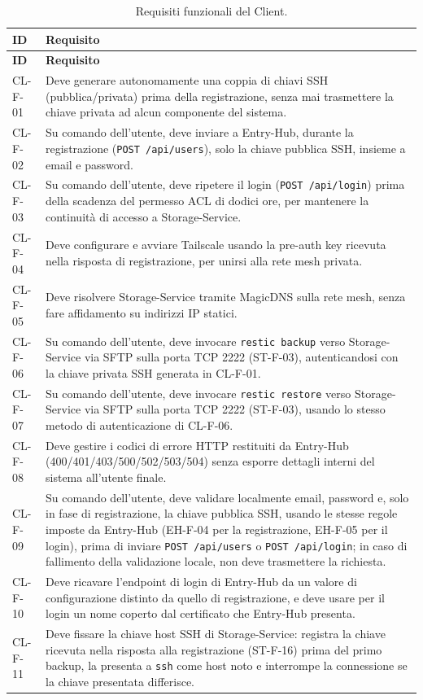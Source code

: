 \begin{longtable}{p{2.6cm} p{\dimexpr\linewidth-2.6cm-4\tabcolsep\relax}}
\caption{Requisiti funzionali del Client.} \\
\hline
\textbf{ID} & \textbf{Requisito} \\
\hline
\endfirsthead
\hline
\textbf{ID} & \textbf{Requisito} \\
\hline
\endhead
\hline
\endfoot
\hline
\endlastfoot
CL-F-01 & Deve generare autonomamente una coppia di chiavi SSH (pubblica/privata) prima della registrazione, senza mai trasmettere la chiave privata ad alcun componente del sistema. \\
CL-F-02 & Su comando dell'utente, deve inviare a Entry-Hub, durante la registrazione (\texttt{POST /api/users}), solo la chiave pubblica SSH, insieme a email e password. \\
CL-F-03 & Su comando dell'utente, deve ripetere il login (\texttt{POST /api/login}) prima della scadenza del permesso ACL di dodici ore, per mantenere la continuità di accesso a Storage-Service. \\
CL-F-04 & Deve configurare e avviare Tailscale usando la pre-auth key ricevuta nella risposta di registrazione, per unirsi alla rete mesh privata. \\
CL-F-05 & Deve risolvere Storage-Service tramite MagicDNS sulla rete mesh, senza fare affidamento su indirizzi IP statici. \\
CL-F-06 & Su comando dell'utente, deve invocare \texttt{restic backup} verso Storage-Service via SFTP sulla porta TCP 2222 (ST-F-03), autenticandosi con la chiave privata SSH generata in CL-F-01. \\
CL-F-07 & Su comando dell'utente, deve invocare \texttt{restic restore} verso Storage-Service via SFTP sulla porta TCP 2222 (ST-F-03), usando lo stesso metodo di autenticazione di CL-F-06. \\
CL-F-08 & Deve gestire i codici di errore HTTP restituiti da Entry-Hub (400/401/403/500/502/503/504) senza esporre dettagli interni del sistema all'utente finale. \\
CL-F-09 & Su comando dell'utente, deve validare localmente email, password e, solo in fase di registrazione, la chiave pubblica SSH, usando le stesse regole imposte da Entry-Hub (EH-F-04 per la registrazione, EH-F-05 per il login), prima di inviare \texttt{POST /api/users} o \texttt{POST /api/login}; in caso di fallimento della validazione locale, non deve trasmettere la richiesta. \\
CL-F-10 & Deve ricavare l'endpoint di login di Entry-Hub da un valore di configurazione distinto da quello di registrazione, e deve usare per il login un nome coperto dal certificato che Entry-Hub presenta. \\
CL-F-11 & Deve fissare la chiave host SSH di Storage-Service: registra la chiave ricevuta nella risposta alla registrazione (ST-F-16) prima del primo backup, la presenta a \texttt{ssh} come host noto e interrompe la connessione se la chiave presentata differisce. \\
\end{longtable}

